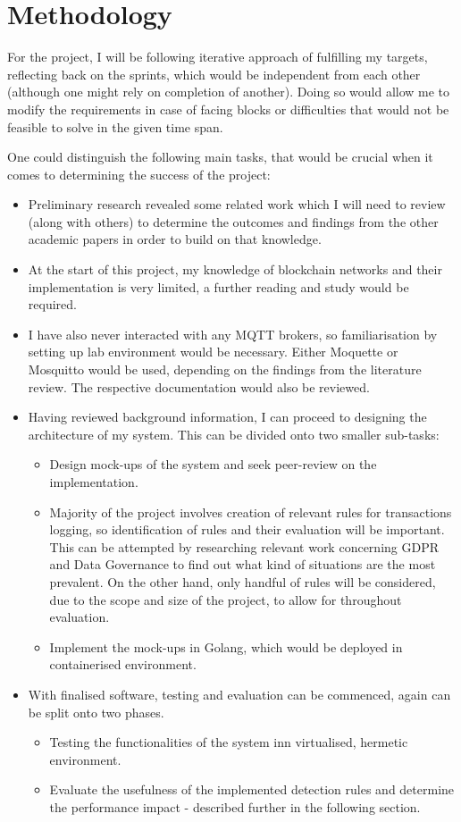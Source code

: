 \documentclass[a4paper,12pt]{article}
\begin{document}
\section*{Methodology}

For the project, I will be following iterative approach of fulfilling my targets, reflecting back on the sprints, which would be independent from each other (although one might rely on completion of another). Doing so would allow me to modify the requirements in case of facing blocks or difficulties that would not be feasible to solve in the given time span.

One could distinguish the following main tasks, that would be crucial when it comes to determining the success of the project:
\begin{itemize}
  \item Preliminary research revealed some related work which I will need to review (along with others) to determine the outcomes and findings from the other academic papers in order to build on that knowledge.
  \item At the start of this project, my knowledge of blockchain networks and their implementation is very limited, a further reading and study would be required.
  \item I have also never interacted with any MQTT brokers, so familiarisation by setting up lab environment would be necessary. Either Moquette or Mosquitto would be used, depending on the findings from the literature review. The respective documentation would also be reviewed.
  \item Having reviewed background information, I can proceed to designing the architecture of my system. This can be divided onto two smaller sub-tasks:
    \begin{itemize}
      \item Design mock-ups of the system and seek peer-review on the implementation.
      \item Majority of the project involves creation of relevant rules for transactions logging, so identification of rules and their evaluation will be important. This can be attempted by researching relevant work concerning GDPR and Data Governance to find out what kind of situations are the most prevalent. On the other hand, only handful of rules will be considered, due to the scope and size of the project, to allow for throughout evaluation.
      \item Implement the mock-ups in Golang, which would be deployed in containerised environment.
    \end{itemize}
  \item With finalised software, testing and evaluation can be commenced, again can be split onto two phases.
    \begin{itemize}
      \item Testing the functionalities of the system inn virtualised, hermetic environment.
      \item Evaluate the usefulness of the implemented detection rules and determine the performance impact - described further in the following section. 
    \end{itemize}
\end{itemize}
\end{document}

